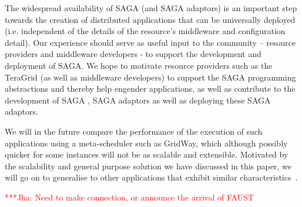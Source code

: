 \documentclass[conference,final]{IEEEtran}
\newcommand{\jhanote}[1]{ {\textcolor{red} { ***Jha: #1 }}}
\begin{document}
The widespread availability of SAGA (and SAGA adaptors) is an
important step towards the creation of distributed applications that
can be universally deployed (i.e.  independent of the details of the
resource's middleware and configuration detail).  Our experience
should serve as useful input to the community -- resource providers
and middleware developers - to support the development and deployment
of SAGA.  We hope to motivate  resource providers such as the TeraGrid
(as well as middleware developers) to support the SAGA programming
abstractions and thereby help engender applications, as well as
contribute to the development of SAGA , SAGA adaptors as well as
deploying these SAGA adaptors.

We will in the future compare the performance of the execution of such
applications using a meta-scheduler such as GridWay, which although
possibly quicker for some instances will not be as scalable and
extensible. Motivated by the scalability and general purpose solution
we have discussed in this paper, we will go on to generalise to other
applications that exhibit similar characteristics~\cite{nature99}.

\jhanote{Need to make connection, or announce the arrival of FAUST}








\end{document}
